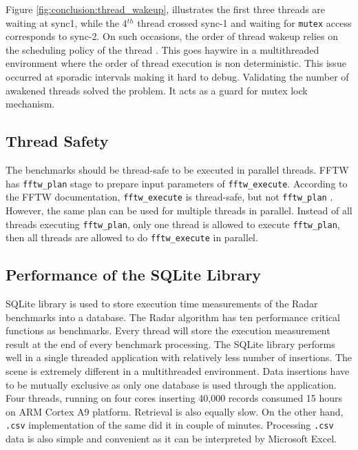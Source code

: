 Figure \ref{fig:conclusion:thread_wakeup}, illustrates the first three threads are waiting at sync1, while the 4$^{th}$ thread crossed sync-1 and waiting for \verb|mutex| access corresponds to sync-2. On such occasions, the order of thread wakeup relies on the scheduling policy of the thread \cite{pthreadWait}. This goes haywire in a multithreaded environment where the order of thread execution is non deterministic. This issue occurred at sporadic intervals making it hard to debug. Validating the number of awakened threads solved the problem. It acts as a guard for mutex lock mechanism. 

\subsection{Thread Safety}
The benchmarks should be thread-safe to be executed in parallel threads. FFTW has \verb|fftw_plan| stage to prepare input parameters of \verb|fftw_execute|. According to the FFTW documentation, \verb|fftw_execute| is thread-safe, but not \verb|fftw_plan| \cite{fftThreadSafe}. However, the same plan can be used for multiple threads in parallel. Instead of all threads executing \verb|fftw_plan|, only one thread is allowed to execute \verb|fftw_plan|, then all threads are allowed to do \verb|fftw_execute| in parallel. \vspace*{0.3cm}

\subsection{Performance of the SQLite Library}
SQLite library is used to store execution time measurements of the Radar benchmarks into a database. The Radar algorithm has ten performance critical functions as benchmarks. Every thread will store the execution measurement result at the end of every benchmark processing. The SQLite library performs well in a single threaded application with relatively less number of insertions. The scene is extremely different in a multithreaded environment. Data insertions have to be mutually exclusive as only one database is used through the application. Four threads, running on four cores inserting 40,000 records consumed 15 hours on ARM Cortex A9 platform. Retrieval is also equally slow. On the other hand, \verb|.csv| implementation of the same did it in couple of minutes. Processing \verb|.csv| data is also simple and convenient as it can be interpreted by Microsoft Excel.


